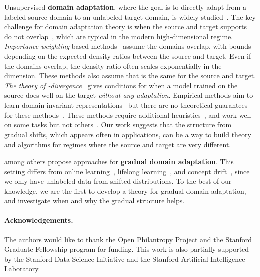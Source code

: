 \documentclass[11pt]{article}
\begin{document}
Unsupervised \textbf{domain adaptation}, where the goal is to directly adapt from a labeled source domain to an unlabeled target domain, is widely studied~\cite{quinonero2009dataset}.
The key challenge for domain adaptation theory is when the source and target supports do not overlap~\cite{zhao2019zhao, shu2018dirtt}, which are typical in the modern high-dimensional regime.
\emph{Importance weighting} based methods~\cite{shimodaira2000improving, sugiyama2007covariate, huang2006correcting} assume the domains overlap, with bounds depending on the expected density ratios between the source and target.
Even if the domains overlap, the density ratio often scales exponentially in the dimension.
These methods also assume that  is the same for the source and target.
\emph{The theory of -divergence}~\cite{ben2010theory, mansour2009domain} gives conditions for when a model trained on the source does well on the target \emph{without any adaptation}.
Empirical methods aim to learn domain invariant representations~\cite{tzeng2014domain, ganin2015domain, tzeng2017domain} but there are no theoretical guarantees for these methods~\cite{zhao2019zhao}.
These methods require additional heuristics~\cite{hoffman2018cycada}, and work well on some tasks but not others~\cite{bobu2018adapting, peng2019moment}.
Our work suggests that the structure from gradual shifts, which appears often in applications, can be a way to build theory and algorithms for regimes where the source and target are very different.



\citet{hoffman2014continuous, gadermayr2018gradual, wulfmeier2018incremental, bobu2018adapting} among others propose approaches for \textbf{gradual domain adaptation}.
This setting differs from online learning~\cite{shalev07online}, lifelong learning~\cite{silver2013lifelong}, and concept drift~\cite{kramer1988learning, bartlett1992learning, bartlett1996learning}, since we only have unlabeled data from shifted distributions. To the best of our knowledge, we are the first to develop a theory for gradual domain adaptation, and investigate when and why the gradual structure helps. 


\paragraph{Acknowledgements.}

The authors would like to thank the Open Philantropy Project and the Stanford Graduate Fellowship program for funding. This work is also partially supported by the Stanford Data Science Initiative and the Stanford Artificial Intelligence Laboratory.
\end{document}
